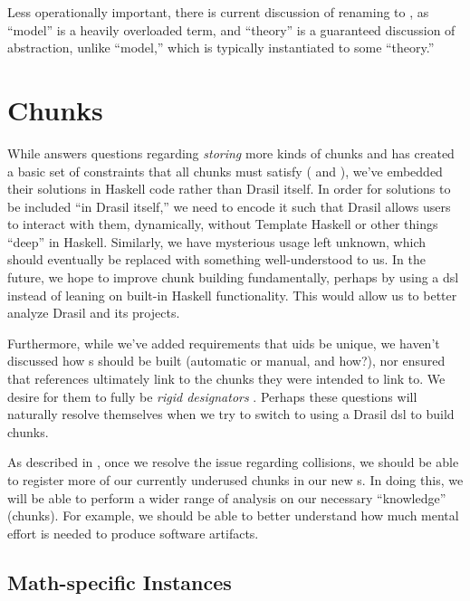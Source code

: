 Less operationally important, there is current discussion of renaming
\ModelKinds{} to \TheoryKinds{} \cite{DrasilIssue2599RenamingModels}, as
``model'' is a heavily overloaded term, and ``theory'' is a guaranteed
discussion of abstraction, unlike ``model,'' which is typically instantiated to
some ``theory.''

\section{Chunks}

While  answers questions regarding \textit{storing}
more kinds of chunks and has created a basic set of constraints that all chunks
must satisfy (\HasUID{} and \HasChunkRefs{}), we've embedded their solutions in
Haskell code rather than Drasil itself. In order for solutions to be included
``in Drasil itself,'' we need to encode it such that Drasil allows users to
interact with them, dynamically, without Template
Haskell\cite{GHC2020TemplateHaskell} or other things ``deep'' in Haskell.
Similarly, we have mysterious \Typeable{} usage left unknown, which should
eventually be replaced with something well-understood to us. In the future, we
hope to improve chunk building fundamentally, perhaps by using a \acs{dsl}
instead of leaning on built-in Haskell functionality. This would allow us to
better analyze Drasil and its projects.

Furthermore, while we've added requirements that \acsp{uid} be unique, we
haven't discussed how \UID{}s should be built (automatic or manual, and how?),
nor ensured that \UID{} references ultimately link to the chunks they were
intended to link to. We desire for them to fully be \textit{rigid designators}
\cite{Kripke1972NandN}. Perhaps these questions will naturally resolve
themselves when we try to switch to using a Drasil \acs{dsl} to build chunks.

As described in , once we resolve the issue regarding
\UID{} collisions, we should be able to register more of our currently underused
chunks in our new \ChunkDB{}s. In doing this, we will be able to perform a wider
range of analysis on our necessary ``knowledge'' (chunks). For example, we
should be able to better understand how much mental effort is needed to produce
software artifacts.

\subsection{Math-specific Instances}


